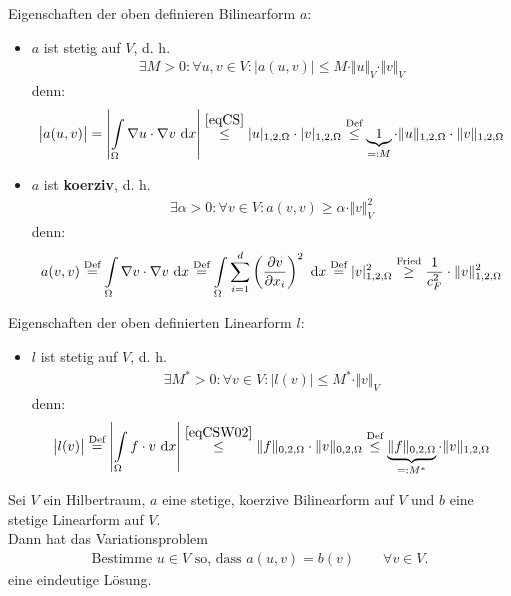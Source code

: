 Eigenschaften der oben definieren Bilinearform $a$:
\begin{itemize}
	\item $a$ ist stetig auf $V$, d. h.
	\begin{align*}
		\exists M>0:\forall u,v\in V:\big|a(u,v)\big|\leq M\cdot\Vert u\Vert_V\cdot\Vert v\Vert_V
	\end{align*}
	denn:
	\begin{align*}
		\big| a(u,v)\big|=\left|\int\limits_\Omega\nabla u\cdot\nabla v\d x\right|
		\overset{\eqref{eqCS}}\leq
		|u|_{1,2,\Omega}\cdot|v|_{1,2,\Omega} %
		\overset{\Def}\leq
		\underbrace{1}_{=:M}\cdot\Vert u\Vert_{1,2,\Omega}\cdot\Vert v\Vert_{1,2,\Omega}
	\end{align*}
	\item $a$ ist \textbf{koerziv}, d. h.
	\begin{align*}
		\exists\alpha>0:\forall v\in V:a(v,v)\geq\alpha\cdot\Vert v\Vert^2_V
	\end{align*}
	denn:
	\begin{align*}
		a(v,v)
		\overset{\text{Def}}=
		\int\limits_\Omega\nabla v\cdot\nabla v\text{ d} x
		\overset{\text{Def}}=
		\int\limits_\Omega\sum\limits_{i=1}^d\left(\frac{\partial v}{\partial x_i}\right)^2\text{ d} x
		\overset{\text{Def}}=
		|v|^2_{1,2,\Omega}
		\stackrel{\text{Fried}}{\geq}
		\frac{1}{c_F^2}\cdot\Vert v\Vert^2_{1,2,\Omega}
	\end{align*}
\end{itemize}

Eigenschaften der oben definierten Linearform $l$:
\begin{itemize}
	\item $l$ ist stetig auf $V$, d. h.
	\begin{align*}
		\exists M^\ast>0:\forall v\in V: \big|l(v)\big|\leq M^\ast\cdot\Vert v\Vert_V
	\end{align*}
	denn:
	\begin{align*}
		\big| l(v)\big|
		\overset{\text{Def}}=
		\left|\int\limits_\Omega f\cdot v\text{ d} x\right|
		\overset{\eqref{eqCSW02}}{\leq}
		\Vert f\Vert_{0,2,\Omega}\cdot\Vert v\Vert_{0,2,\Omega}
		\stackrel{\text{Def}}{\leq}
		\underbrace{\Vert f\Vert_{0,2,\Omega}}_{=:M^\ast}\cdot\Vert v\Vert_{1,2,\Omega}
	\end{align*}
\end{itemize}

\begin{theorem}\label{theorem2.1LaxMilgram}\enter
	Sei $V$ ein Hilbertraum, $a$ eine stetige, koerzive Bilinearform auf $V$ und $b$ eine stetige Linearform auf $V$.\\
	Dann hat das Variationsproblem
	\begin{align*}
		\text{Bestimme $u\in V$ so, dass }a(u,v)=b(v)\qquad\forall v\in V.
	\end{align*}
	eine eindeutige Lösung.
\end{theorem}


